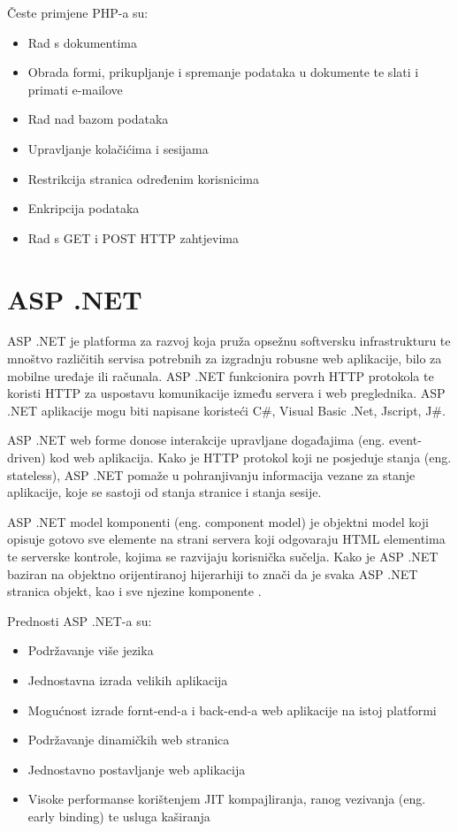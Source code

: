 \documentclass[12pt, oneside, onecolumn]{book}
\begin{document}
{Česte primjene PHP-a su:

\begin{itemize}
\item Rad s dokumentima
\item Obrada formi, prikupljanje i spremanje podataka u dokumente te slati i primati e-mailove
\item Rad nad bazom podataka
\item Upravljanje kolačićima i sesijama
\item Restrikcija stranica određenim korisnicima
\item Enkripcija podataka
\item Rad s GET i POST HTTP zahtjevima
\end{itemize}

\section{ASP .NET}
ASP .NET je platforma za razvoj koja pruža opsežnu softversku infrastrukturu te mnoštvo različitih servisa potrebnih za izgradnju robusne web aplikacije, bilo za mobilne uređaje ili računala. ASP .NET funkcionira povrh HTTP protokola te koristi HTTP za uspostavu komunikacije između servera i web preglednika. ASP .NET aplikacije mogu biti napisane koristeći C\#, Visual Basic .Net, Jscript, J\#.

ASP .NET web forme donose interakcije upravljane događajima (eng. event-driven) kod web aplikacija. Kako je HTTP protokol koji ne posjeduje stanja (eng. stateless), ASP .NET pomaže u pohranjivanju informacija vezane za stanje aplikacije, koje se sastoji od stanja stranice i stanja sesije.

ASP .NET model komponenti (eng. component model) je objektni model koji opisuje gotovo sve elemente na strani servera koji odgovaraju HTML elementima te serverske kontrole, kojima se razvijaju korisnička sučelja. Kako je ASP .NET baziran na objektno orijentiranoj hijerarhiji to znači da je svaka ASP .NET stranica objekt, kao i sve njezine komponente \cite{aspnet}. 

Prednosti ASP .NET-a su:

\begin{itemize}
\item Podržavanje više jezika
\item Jednostavna izrada velikih aplikacija
\item Mogućnost izrade fornt-end-a i back-end-a web aplikacije na istoj platformi
\item Podržavanje dinamičkih web stranica
\item Jednostavno postavljanje web aplikacija
\item Visoke performanse korištenjem JIT kompajliranja, ranog vezivanja (eng. early binding) te usluga kaširanja
\end{itemize}

}
\end{document}
